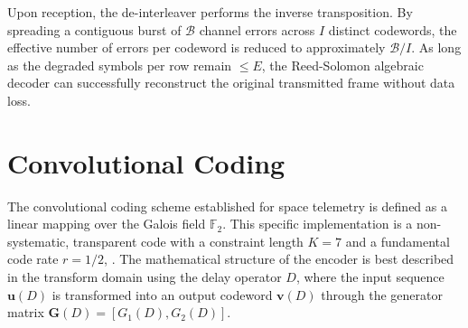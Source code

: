 Upon reception, the de-interleaver performs the inverse transposition. By spreading a contiguous burst of $\mathcal{B}$ channel errors across $I$ distinct codewords, the effective number of errors per codeword is reduced to approximately $\mathcal{B}/I$. As long as the degraded symbols per row remain $\leq E$, the Reed-Solomon algebraic decoder can successfully reconstruct the original transmitted frame without data loss.


\section{Convolutional Coding} \label{sec:cc}

The convolutional coding scheme established for space telemetry \autocite[Section 3]{CCSDS_131_0_B_5} is defined as a linear mapping over the Galois field $\mathbb{F}_{2}$. This specific implementation is a non-systematic, transparent code with a constraint length $K=7$ and a fundamental code rate $r=1/2$, . The mathematical structure of the encoder is best described in the transform domain using the delay operator $D$, where the input sequence $\bm{u}(D)$ is transformed into an output codeword $\bm{v}(D)$ through the generator matrix $\bm{G}(D) = [G_{1}(D), G_{2}(D)]$.

